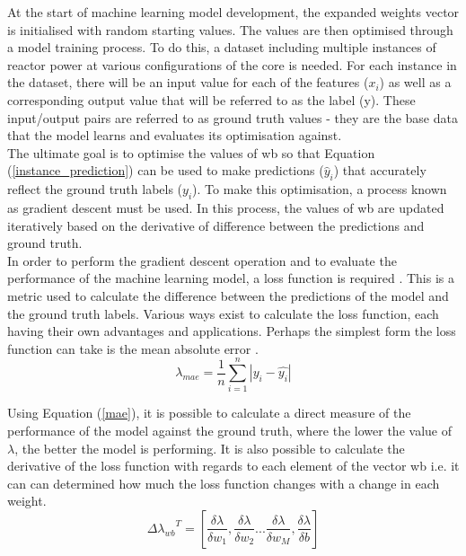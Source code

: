 \noindent
At the start of machine learning model development, the expanded weights vector is initialised with random starting values. The values are then optimised through a model training process. To do this, a dataset including multiple instances of reactor power at various configurations of the core is needed. For each instance in the dataset, there will be an input value for each of the features ($x_i$) as well as a corresponding output value that will be referred to as the label (y). These input/output pairs are referred to as ground truth values - they are the base data that the model learns and evaluates its optimisation against.
\\

\noindent
The ultimate goal is to optimise the values of wb so that Equation (\ref{instance_prediction}) can be used to make predictions ($\hat{y}_i$) that accurately reflect the ground truth labels ($y_i$). To make this optimisation, a process known as gradient descent \cite{ruder2016overview} must be used. In this process, the values of wb are updated iteratively based on the derivative of difference between the predictions and ground truth. \\

\noindent
In order to perform the gradient descent operation and to evaluate the performance of the machine learning model, a loss function is required \cite{wang2022comprehensive}. This is a metric used to calculate the difference between the predictions of the model and the ground truth labels. Various ways exist to calculate the loss function, each having their own advantages and applications. Perhaps the simplest form the loss function can take is the mean absolute error \cite{willmott2005advantages}.\\

\begin{equation} \label{mae}
	\lambda_{mae} = \frac{1}{n}\sum_{i=1}^n | y_i - \hat{y_i} | 
\end{equation}

\noindent
Using Equation (\ref{mae}), it is possible to calculate a direct measure of the performance of the model against the ground truth, where the lower the value of $\lambda$, the better the model is performing.  It is also possible to calculate the derivative of the loss function with regards to each element of the vector wb i.e. it can can determined how much the loss function changes with a change in each weight. \\

\begin{equation} \label{derivative}
	{\Delta\lambda_{wb}}^T = [\frac{\delta\lambda}{\delta w_1}, \frac{\delta\lambda}{\delta w_2} ... \frac{\delta\lambda}{\delta w_M}, \frac{\delta\lambda}{\delta b}]
\end{equation}

